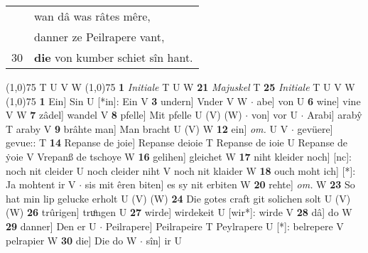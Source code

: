 \documentclass[8pt,a4paper,notitlepage]{article}
\begin{document}
\begin{table}[ht]
\begin{minipage}[t]{0.5\linewidth}
\begin{tabular}{rl}
 & wan dâ was râtes mêre,\\ 
 & danner ze Peilrapere vant,\\ 
30 & \textbf{die} von kumber schiet sîn hant.\\ 
\end{tabular}
\scriptsize
\line(1,0){75} \newline
T U V W \newline
\line(1,0){75} \newline
\textbf{1} \textit{Initiale} T U W  \textbf{21} \textit{Majuskel} T  \textbf{25} \textit{Initiale} T U V W  \newline
\line(1,0){75} \newline
\textbf{1} Ein] Sin U [*in]: Ein V \textbf{3} undern] Vnder V W  $\cdot$ abe] von U \textbf{6} wine] vine V W \textbf{7} zâdel] wandel V \textbf{8} pfelle] Mit pfelle U (V) (W)  $\cdot$ von] vor U  $\cdot$ Arabi] arabŷ T araby V \textbf{9} brâhte man] Man bracht U (V) W \textbf{12} ein] \textit{om.} U V  $\cdot$ gevüere] gevue:: T \textbf{14} Repanse de joie] Repanse deioie T Repanse de ioie U Repanse de ẏoie V Vrepanß de tschoye W \textbf{16} gelihen] gleichet W \textbf{17} niht kleider noch] [nc]: noch nit cleider U noch cleider niht V noch nit klaider W \textbf{18} ouch moht ich] [*]: Ja mohtent ir V  $\cdot$ sis mit êren biten] es sy nit erbiten W \textbf{20} rehte] \textit{om.} W \textbf{23} So hat min lip gelucke erholt U (V) (W) \textbf{24} Die gotes craft git solichen solt U (V) (W) \textbf{26} trûrigen] truͦngen U \textbf{27} wirde] wirdekeit U [wir*]: wirde V \textbf{28} dâ] do W \textbf{29} danner] Den er U  $\cdot$ Peilrapere] Peilrapeire T Peylrapere U [*]: belrepere V pelrapier W \textbf{30} die] Die do W  $\cdot$ sîn] ir U \newline
\end{minipage}
\end{table}
\end{document}

